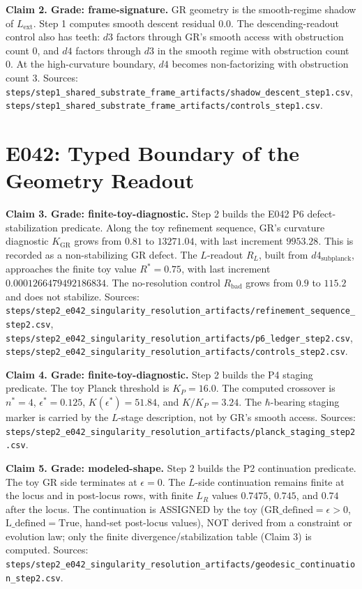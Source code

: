 \documentclass[11pt]{article}
\begin{document}
\textbf{Claim 2. Grade: frame-signature.}
GR geometry is the smooth-regime shadow of \(L_{\mathrm{ext}}\). Step 1 computes smooth descent residual \(0.0\). The descending-readout control also has teeth: \(d3\) factors through GR's smooth access with obstruction count \(0\), and \(d4\) factors through \(d3\) in the smooth regime with obstruction count \(0\). At the high-curvature boundary, \(d4\) becomes non-factorizing with obstruction count \(3\).
Sources: \texttt{steps/step1\_shared\_substrate\_frame\_artifacts/shadow\_descent\_step1.csv}, \texttt{steps/step1\_shared\_substrate\_frame\_artifacts/controls\_step1.csv}.

\section{E042: Typed Boundary of the Geometry Readout}

\textbf{Claim 3. Grade: finite-toy-diagnostic.}
Step 2 builds the E042 P6 defect-stabilization predicate. Along the toy refinement sequence, GR's curvature diagnostic \(K_{\mathrm{GR}}\) grows from \(0.81\) to \(13271.04\), with last increment \(9953.28\). This is recorded as a non-stabilizing GR defect. The \(L\)-readout \(R_L\), built from \(d4_{\mathrm{subplanck}}\), approaches the finite toy value \(R^\ast=0.75\), with last increment \(0.0001266479492186834\). The no-resolution control \(R_{\mathrm{bad}}\) grows from \(0.9\) to \(115.2\) and does not stabilize.
Sources: \texttt{steps/step2\_e042\_singularity\_resolution\_artifacts/refinement\_sequence\_step2.csv}, \texttt{steps/step2\_e042\_singularity\_resolution\_artifacts/p6\_ledger\_step2.csv}, \texttt{steps/step2\_e042\_singularity\_resolution\_artifacts/controls\_step2.csv}.

\textbf{Claim 4. Grade: finite-toy-diagnostic.}
Step 2 builds the P4 staging predicate. The toy Planck threshold is \(K_P=16.0\). The computed crossover is \(n^\ast=4\), \(\epsilon^\ast=0.125\), \(K(\epsilon^\ast)=51.84\), and \(K/K_P=3.24\). The \(\hbar\)-bearing staging marker is carried by the \(L\)-stage description, not by GR's smooth access.
Sources: \texttt{steps/step2\_e042\_singularity\_resolution\_artifacts/planck\_staging\_step2.csv}.

\textbf{Claim 5. Grade: modeled-shape.}
Step 2 builds the P2 continuation predicate. The toy GR side terminates at \(\epsilon=0\). The \(L\)-side continuation remains finite at the locus and in post-locus rows, with finite \(L_R\) values \(0.7475\), \(0.745\), and \(0.74\) after the locus.
The continuation is ASSIGNED by the toy (\(\mathrm{GR\_defined}=\epsilon>0\), \(\mathrm{L\_defined}=\mathrm{True}\), hand-set post-locus values), NOT derived from a constraint or evolution law; only the finite divergence/stabilization table (Claim 3) is computed.
Sources: \texttt{steps/step2\_e042\_singularity\_resolution\_artifacts/geodesic\_continuation\_step2.csv}.
\end{document}

